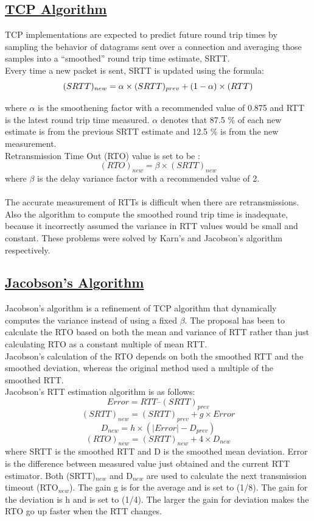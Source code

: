 \documentclass[12pt]{article}
\begin{document}
\subsection{\underline{TCP Algorithm}}

TCP implementations are expected to predict future round trip times by sampling the behavior of datagrams sent over a connection and averaging those samples into a “smoothed” round trip time estimate, SRTT.\\
Every time a new packet is sent, SRTT is updated using the formula:\\
\[
(SRTT)_{new} =  \alpha \times (SRTT)_{prev} + (1-\alpha )\times (RTT)\\
\]

where  $\alpha$  is  the smoothening factor with a recommended value of 0.875 and  RTT  is the latest round trip time measured. $\alpha$ denotes that 87.5 \% of each new estimate is from the  previous SRTT estimate  and 12.5 \% is from the new measurement.\\
 Retransmission Time Out (RTO)  value is set to be :\\

\[
 (RTO )_{new} = \beta  \times  (SRTT)_{new}
\] 
where $\beta$ is the delay variance factor with a recommended value of 2. \\ \\
The accurate measurement of RTTs is difficult when there are retransmissions. Also the algorithm to compute the smoothed round trip time is inadequate, because it incorrectly assumed the variance in RTT values would be small and constant. These problems were solved by Karn’s and Jacobson’s algorithm respectively.
\subsection{\underline{Jacobson's Algorithm}}
Jacobson’s algorithm is a refinement of TCP algorithm that dynamically computes the variance instead of using a fixed $\beta$. The proposal has been to calculate the RTO based on both the mean and variance of RTT rather than just calculating RTO as a constant multiple of mean RTT.\\
Jacobson’s calculation of the RTO depends on both the smoothed RTT and the smoothed deviation, whereas the original method used a multiple of the smoothed RTT.\\
Jacobson’s RTT estimation algorithm is as follows:
\[
Error = RTT  –  (SRTT)_{prev}
\]
\[
(SRTT)_{new} = (SRTT)_{prev} + g \times Error			
\]
\[
D_{new} = h\times (|Error| - D_{prev})
\]
\[
(RTO)_{new} = (SRTT)_{new} + 4\times D_{new}
\]
where SRTT is the smoothed RTT and D is the smoothed mean deviation. Error is the difference between measured value just obtained and the current RTT estimator. Both (SRTT)$_{new}$ and D$_{new}$ are used to calculate the next transmission timeout (RTO$_{new}$). The gain g is for the average and is set to (1/8). The gain for the deviation is h and is set to (1/4). The larger the gain for deviation makes the RTO go up faster when the RTT changes.
\end{document}

